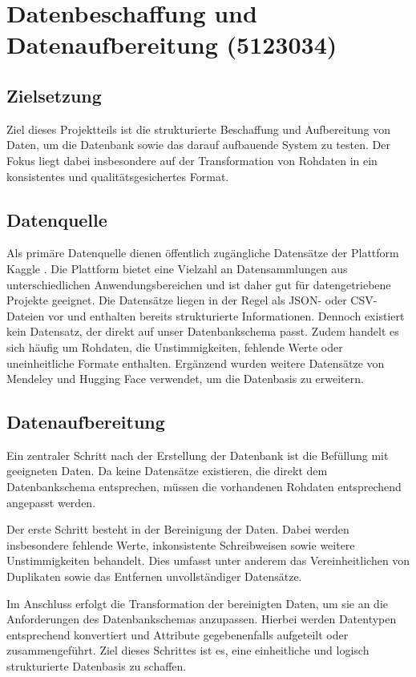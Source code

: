 \section{Datenbeschaffung und Datenaufbereitung (5123034)}
\subsection{Zielsetzung}
Ziel dieses Projektteils ist die strukturierte Beschaffung und Aufbereitung von Daten, um die Datenbank sowie 
das darauf aufbauende System zu testen. Der Fokus liegt dabei insbesondere auf der Transformation von Rohdaten in 
ein konsistentes und qualitätsgesichertes Format.
\subsection{Datenquelle}
Als primäre Datenquelle dienen öffentlich zugängliche Datensätze der Plattform Kaggle \cite{Kaggle_Synthetic_Person}. 
Die Plattform bietet eine Vielzahl an Datensammlungen aus unterschiedlichen Anwendungsbereichen und ist daher gut 
für datengetriebene Projekte geeignet.
Die Datensätze liegen in der Regel als JSON- oder CSV-Dateien vor und enthalten bereits strukturierte Informationen. 
Dennoch existiert kein Datensatz, der direkt auf unser Datenbankschema passt. Zudem handelt es sich häufig um Rohdaten, 
die Unstimmigkeiten, fehlende Werte oder uneinheitliche Formate enthalten.
Ergänzend wurden weitere Datensätze von Mendeley \cite{Mendeley_Dataset} und Hugging Face \cite{HuggingFace_Dataset} 
verwendet, um die Datenbasis zu erweitern.
\subsection{Datenaufbereitung}
Ein zentraler Schritt nach der Erstellung der Datenbank ist die Befüllung mit geeigneten Daten. Da 
keine Datensätze existieren, die direkt dem Datenbankschema entsprechen, müssen die vorhandenen 
Rohdaten entsprechend angepasst werden.

Der erste Schritt besteht in der Bereinigung der Daten. Dabei werden insbesondere fehlende Werte, 
inkonsistente Schreibweisen sowie weitere Unstimmigkeiten behandelt. Dies umfasst unter anderem das 
Vereinheitlichen von Duplikaten sowie das Entfernen unvollständiger Datensätze.

Im Anschluss erfolgt die Transformation der bereinigten Daten, um sie an die Anforderungen des Datenbankschemas 
anzupassen. Hierbei werden Datentypen entsprechend konvertiert und Attribute gegebenenfalls aufgeteilt oder 
zusammengeführt. Ziel dieses Schrittes ist es, eine einheitliche und logisch strukturierte Datenbasis zu schaffen.


